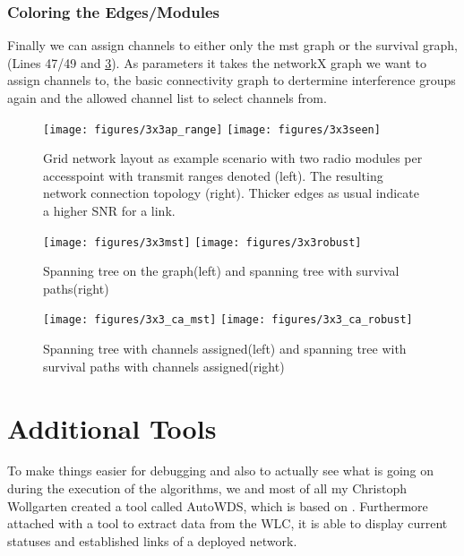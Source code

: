       \subsubsection{Coloring the Edges/Modules}
	Finally we can assign channels to either only the mst graph or the survival graph, (Lines 47/49 and \ref{fig:3x3third}).
	As parameters it takes the networkX graph we want to assign channels to, the basic connectivity graph to dertermine 
	interference groups again and the allowed channel list to select channels from. 
	
      \begin{figure}[t]
	\centering
	\texttt{[image: figures/3x3ap\_range]}
	\texttt{[image: figures/3x3seen]}
	\caption{Grid network layout as example scenario with two radio modules per accesspoint with transmit ranges denoted (left). 
	  The resulting network connection topology (right). Thicker edges as usual indicate a higher SNR for a link.}
	\label{fig:3x3initial}
      \end{figure}
      
      \begin{figure}[t]
	\centering
	\texttt{[image: figures/3x3mst]}
	\texttt{[image: figures/3x3robust]}
	\caption{Spanning tree on the graph(left) and spanning tree with survival paths(right)}
	\label{fig:3x3second}
      \end{figure}
      
      \begin{figure}[t]
	\centering
	\texttt{[image: figures/3x3\_ca\_mst]}
	\texttt{[image: figures/3x3\_ca\_robust]}
	\caption{Spanning tree with channels assigned(left) and spanning tree with survival paths with channels assigned(right)}
	\label{fig:3x3third}
      \end{figure}
      
  \section{Additional Tools}
    To make things easier for debugging and also to actually see what is going on during the execution of the algorithms,
    we and most of all my Christoph Wollgarten created a tool called AutoWDS, which is based on \cite{d3js}. 
    Furthermore attached with a tool to extract data from the WLC, it is able to display current statuses and established links of a deployed network.
    
